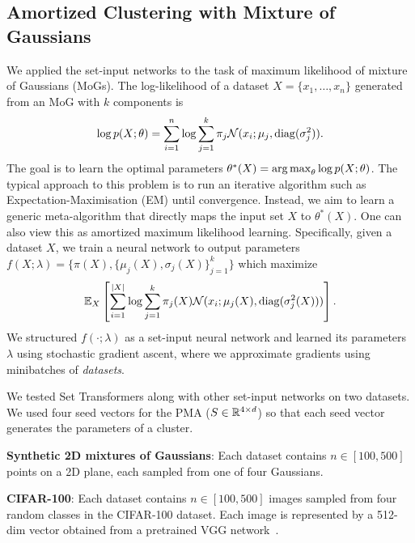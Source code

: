 \subsection{Amortized Clustering with Mixture of Gaussians}
We applied the set-input networks to the task of maximum likelihood of mixture of Gaussians (MoGs).
The log-likelihood of a dataset $X = \{x_1, \dots, x_n\}$ generated from an MoG with $k$ components is
{
\[
\log p(X; \theta)
= \sum_{i=1}^n  \log \sum_{j=1}^k \pi_j \mathcal{N} ( x_i ; \mu_j, \mathrm{diag}(\sigma^2_j)).
\]}
The goal is to learn the optimal parameters $\theta^*(X) = \operatorname*{arg\,max}_\theta \log p(X;\theta)$.
The typical approach to this problem is to run an iterative algorithm such as Expectation-Maximisation (EM) until convergence.
Instead, we aim to learn a generic meta-algorithm that directly maps the input set $X$ to $\theta^*(X)$.
One can also view this as amortized maximum likelihood learning.
Specifically, given a dataset $X$, we train a neural network to output parameters $f(X;\lambda) = \{\pi(X), \{\mu_j(X), \sigma_j(X)\}_{j=1}^k\}$ which maximize
{\small
\[
\mathbb{E}_X \left[ \sum_{i=1}^{|X|} \log \sum_{j=1}^k \pi_j(X) \mathcal{N}(x_i ; \mu_j(X), \mathrm{diag}(\sigma_j^2(X)))\right].
\]}
We structured $f(\cdot;\lambda)$ as a set-input neural network and learned its parameters $\lambda$ using stochastic gradient ascent, where we approximate gradients using minibatches of \emph{datasets}.

We tested Set Transformers along with other set-input networks on two datasets.
We used four seed vectors for the PMA ($S\in\mathbb{R}^{4\times d}$) so that each seed vector generates the parameters of a cluster.

\textbf{Synthetic 2D mixtures of Gaussians}:  Each dataset contains $n \in [100, 500]$ points on a 2D plane, each sampled from one of four Gaussians.

\textbf{CIFAR-100}: Each dataset contains $n \in [100, 500]$ images sampled from four random classes in the CIFAR-100 dataset.
Each image is represented by a 512-dim vector obtained from a pretrained VGG network~\citep{Simonyan2014}.

